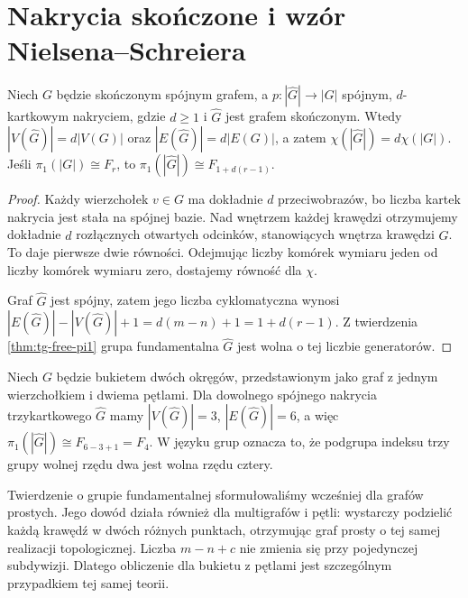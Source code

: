 \section{Nakrycia skończone i wzór Nielsena--Schreiera}
\label{sec:tg-finite-cover}

\begin{twierdzenie}
Niech $G$ będzie skończonym spójnym grafem, a
$p:|\widehat G|\to|G|$ spójnym, $d$-kartkowym nakryciem,
gdzie $d\ge1$ i $\widehat G$ jest grafem skończonym.
Wtedy $|V(\widehat G)|=d|V(G)|$ oraz
$|E(\widehat G)|=d|E(G)|$, a zatem
$\chi(|\widehat G|)=d\chi(|G|)$.
Jeśli $\pi_1(|G|)\cong F_r$, to
$\pi_1(|\widehat G|)\cong F_{1+d(r-1)}$.
\end{twierdzenie}

\begin{proof}
Każdy wierzchołek $v\in G$ ma dokładnie $d$ przeciwobrazów,
bo liczba kartek nakrycia jest stała na spójnej bazie.
Nad wnętrzem każdej krawędzi otrzymujemy dokładnie $d$
rozłącznych otwartych odcinków, stanowiących wnętrza
krawędzi $\widehat G$. To daje pierwsze dwie równości.
Odejmując liczby komórek wymiaru jeden od liczby
komórek wymiaru zero, dostajemy równość dla $\chi$.

Graf $\widehat G$ jest spójny, zatem jego liczba cyklomatyczna
wynosi
$|E(\widehat G)|-|V(\widehat G)|+1
=d(m-n)+1=1+d(r-1)$.
Z twierdzenia \ref{thm:tg-free-pi1} grupa fundamentalna
$\widehat G$ jest wolna o tej liczbie generatorów.
\end{proof}

\begin{przyklad}
Niech $G$ będzie bukietem dwóch okręgów, przedstawionym jako
graf z jednym wierzchołkiem i dwiema pętlami. Dla dowolnego
spójnego nakrycia trzykartkowego $\widehat G$ mamy
$|V(\widehat G)|=3$, $|E(\widehat G)|=6$, a więc
$\pi_1(|\widehat G|)\cong F_{6-3+1}=F_4$.
W języku grup oznacza to, że podgrupa indeksu trzy
grupy wolnej rzędu dwa jest wolna rzędu cztery.
\end{przyklad}

\begin{uwaga}
Twierdzenie o grupie fundamentalnej sformułowaliśmy wcześniej
dla grafów prostych. Jego dowód działa również dla multigrafów
i pętli: wystarczy podzielić każdą krawędź w dwóch różnych
punktach, otrzymując graf prosty o tej samej realizacji
topologicznej. Liczba $m-n+c$ nie zmienia się przy pojedynczej
subdywizji. Dlatego obliczenie dla bukietu z pętlami
jest szczególnym przypadkiem tej samej teorii.
\end{uwaga}

